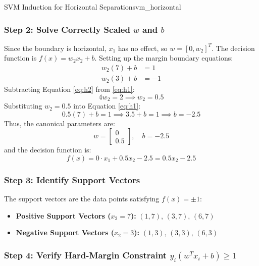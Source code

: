 \begin{example}{SVM Induction for Horizontal Separation}{svm_horizontal}
\subsubsection{Step 2: Solve Correctly Scaled \texorpdfstring{$w$}{w} and \texorpdfstring{$b$}{b}}
Since the boundary is horizontal, $x_1$ has no effect, so $w = [0, w_2]^T$. The decision function is $f(x) = w_2 x_2 + b$. Setting up the margin boundary equations:
\begin{align}
w_2(7) + b &= 1 \label{eq:h1} \\
w_2(3) + b &= -1 \label{eq:h2}
\end{align}
Subtracting Equation \eqref{eq:h2} from \eqref{eq:h1}:
\begin{equation}
4 w_2 = 2 \implies w_2 = 0.5
\end{equation}
Substituting $w_2 = 0.5$ into Equation \eqref{eq:h1}:
\begin{equation}
0.5(7) + b = 1 \implies 3.5 + b = 1 \implies b = -2.5
\end{equation}
Thus, the canonical parameters are:
\begin{equation}
w = \begin{bmatrix} 0 \\ 0.5 \end{bmatrix}, \quad b = -2.5
\end{equation}
and the decision function is:
\begin{equation}
f(x) = 0 \cdot x_1 + 0.5 x_2 - 2.5 = 0.5 x_2 - 2.5
\end{equation}

\subsubsection{Step 3: Identify Support Vectors}
The support vectors are the data points satisfying $f(x) = \pm 1$:
\begin{itemize}
    \item \textbf{Positive Support Vectors ($x_2 = 7$):} $(1, 7),\, (3, 7),\, (6, 7)$
    \item \textbf{Negative Support Vectors ($x_2 = 3$):} $(1, 3),\, (3, 3),\, (6, 3)$
\end{itemize}

\subsubsection{Step 4: Verify Hard-Margin Constraint \texorpdfstring{$y_i(w^T x_i + b) \ge 1$}{yi(w^T xi + b) >= 1}}


\end{example}
